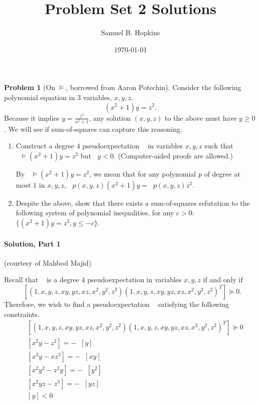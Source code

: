 \documentclass[11pt]{article}
\title{Problem Set 2 Solutions}
\author{Samuel B. Hopkins}
\date{\today}
\theoremstyle{definition}
\newtheorem{problem}[theorem]{Problem}
\newcommand{\brac}[1]{\left[ #1 \right]}
\DeclareMathOperator{\pE}{\widetilde{\mathbb{E}}} %
\begin{document}
\maketitle

\begin{problem}[On $\vDash$, borrowed from Aaron Potechin]

  Consider the following polynomial equation in $3$ variables, $x,y,z$.
  \[ (x^2 + 1) y = z^2. \]
  Because it implies $y = \frac{z^2}{x^2+1}$, any solution $(x,y,z)$ to the above must have $y \ge 0$. We will see if sum-of-squares can capture this reasoning.

  \begin{enumerate}
    \item Construct a degree $4$ pseudoexpectation $\pE$ in variables $x,y,z$ such that $\pE \vDash (x^2+1)y = z^2$ but $\pE y < 0$. (Computer-aided proofs are allowed.)

    By $\pE \vDash (x^2+1)y = z^2$, we mean that for any polynomial $p$ of degree at most $1$ in $x,y,z$, $\pE p(x,y,z)(x^2+1)y = \pE p(x,y,z)z^2$.

    \item Despite the above, show that there exists a sum-of-squares refutation to the following system of polynomial inequalities, for any $c > 0$: $\{ (x^2+1)y = z^2 , y \le -c \}$.
  \end{enumerate}
\end{problem}


\paragraph{Solution, Part 1} (courtesy of Mahbod Majid)

  Recall that $\pE$ is a degree 4 pseudoexpectation in variables $x,y,z$ if and only if
  \[ \pE \brac{(1, x, y, z, xy, yz, xz, x^2, y^2, z^2)(1, x, y, z, xy, yz, xz, x^2, y^2, z^2)^T} \succcurlyeq 0. \]
  Therefore, we wish to find a pseudoexpectation $\pE$ satisfying the following constraints.
  \begin{align*}
      &\pE \brac{(1, x, y, z, xy, yz, xz, x^2, y^2, z^2)(1, x, y, z, xy, yz, xz, x^2, y^2, z^2)^T} \succcurlyeq 0\\
      &\pE \brac{x^2 y - z^2} = -\pE\brac{y} \\
      &\pE \brac{x^3 y - xz^2} = -\pE\brac{xy} \\
      &\pE \brac{x^2 y^2 - z^2y} = -\pE\brac{y^2} \\
      &\pE \brac{x^2 y z - z^3} = -\pE\brac{yz} \\
      &\pE \brac{y} < 0
  \end{align*}
\end{document}
